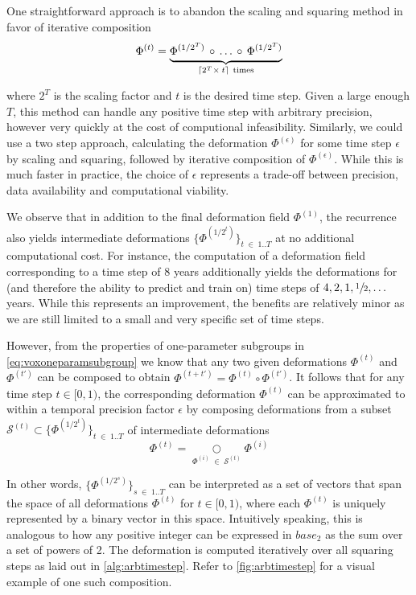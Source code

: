 One straightforward approach is to abandon the scaling and squaring method in favor of iterative composition
\begin{equation}
	\Phi^{(t)} =
	\underbrace{
		\Phi^{(1 / 2^T)} \, \circ \, \ldots \, \circ \, \Phi^{(1 / 2^T)} \vphantom{\Phi^{(1 / 2^T)}_2}
	}_{\lceil 2^T \times \: t \rceil \ \text{times}}
\end{equation}

where $2^T$ is the scaling factor and $t$ is the desired time step. Given a large enough $T$, this method can handle any positive time step with arbitrary precision, however very quickly at the cost of computional infeasibility. Similarly, we could use a two step approach, calculating the deformation $\Phi^{(\epsilon)}$ for some time step $\epsilon$ by scaling and squaring, followed by iterative composition of $\Phi^{(\epsilon)}$. While this is much faster in practice, the choice of $\epsilon$ represents a trade-off between precision, data availability and computational viability.

We observe that in addition to the final deformation field $\Phi^{(1)}$, the recurrence also yields intermediate deformations $\{ \Phi^{(1 / 2^{t})} \}_{t \; \in \; 1 .. T} $ at no additional computational cost. For instance, the computation of a deformation field corresponding to a time step of 8 years additionally yields the deformations for (and therefore the ability to predict and train on) time steps of ${ 4, 2, 1, \sfrac{1}{2}, \ldots }$ years. While this represents an improvement, the benefits are relatively minor as we are still limited to a small and very specific set of time steps.

However, from the properties of one-parameter subgroups in \autoref{eq:voxoneparamsubgroup} we know that any two given deformations $\Phi^{(t)}$ and $\Phi^{(t')}$ can be composed to obtain ${ \Phi^{(t + t')} = \Phi^{(t)} \circ \Phi^{(t')} }$. It follows that for any time step $t \in [0, 1)$, the corresponding deformation $\Phi^{(t)}$ can be approximated to within a temporal precision factor $\epsilon$ by composing deformations from a subset $\mathcal{S}^{(t)} \subset \{ \Phi^{(1 / 2^{t})} \}_{t \; \in \; 1 .. T} $ of intermediate deformations
\begin{equation}
	\Phi^{(t)} = \underset{\Phi^{(i)} \; \in \; \mathcal{S}^{(t)}}{\bigcirc} \Phi^{(i)}
\end{equation}

In other words, $\{ \Phi^{(1 / 2^{s})} \}_{s \; \in \; 1 .. T}$ can be interpreted as a set of vectors that span the space of all deformations $\Phi^{(t)}$ for $t \in [0, 1)$, where each $\Phi^{(t)}$ is uniquely represented by a binary vector in this space. Intuitively speaking, this is analogous to how any positive integer can be expressed in $base_2$ as the sum over a set of powers of 2. The deformation is computed iteratively over all squaring steps as laid out in \autoref{alg:arbtimestep}. Refer to \autoref{fig:arbtimestep} for a visual example of one such composition.

